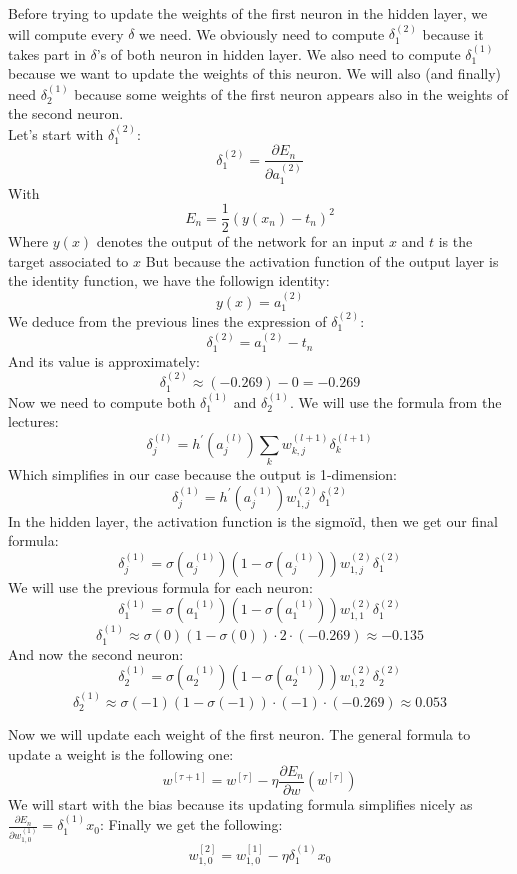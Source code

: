 \documentclass[a4paper, 10pt]{article}
\begin{document}
Before trying to update the weights of the first neuron in the hidden layer, we will compute every $\delta$ we need.
We obviously need to compute $\delta_1^{(2)}$ because it takes part in $\delta$'s of both neuron in hidden layer.
We also need to compute $\delta_1^{(1)}$ because we want to update the weights of this neuron. We will also (and finally) need 
$\delta_2^{(1)}$ because some weights of the first neuron appears also in the weights of the second neuron.
\\
Let's start with $\delta_1^{(2)}$:
$$
\delta_1^{(2)} =  \frac{\partial E_n}{\partial a_1^{(2)}}
$$
With 
$$
E_n = \frac{1}{2} (y(x_n)-t_n)^2
$$
Where $y(x)$ denotes the output of the network for an input $x$ and $t$ is the target associated to $x$
But because the activation function of the output layer is the identity function, we have the followign identity:
$$
y(x) = a_1^{(2)}
$$
We deduce from the previous lines the expression of $\delta_1^{(2)}$:
$$
\delta_1^{(2)} = a_1^{(2)} - t_n
$$
And its value is approximately:
$$
\delta_1^{(2)} \approx (-0.269) - 0 = -0.269
$$
Now we need to compute both $\delta_1^{(1)}$ and $\delta_2^{(1)}$.
We will use the formula from the lectures:
$$
\delta_j^{(l)} = h^\prime(a_j^{(l)})\sum_k w_{k,j}^{(l+1)}\delta_k^{(l+1)} 
$$
Which simplifies in our case because the output is 1-dimension:
$$
\delta_j^{(1)} = h^\prime(a_j^{(1)})w_{1,j}^{(2)}\delta_1^{(2)} 
$$
In the hidden layer, the activation function is the sigmoïd, then we get our final formula:
$$
\delta_j^{(1)} = \sigma(a_j^{(1)})(1-\sigma(a_j^{(1)}))w_{1,j}^{(2)}\delta_1^{(2)} 
$$
We will use the previous formula for each neuron:
$$
\delta_1^{(1)} = \sigma(a_1^{(1)})(1-\sigma(a_1^{(1)}))w_{1,1}^{(2)}\delta_1^{(2)} 
$$
$$
\delta_1^{(1)} \approx \sigma(0)(1-\sigma(0))\cdot2\cdot(-0.269) \approx -0.135
$$
And now the second neuron:
$$
\delta_2^{(1)} = \sigma(a_2^{(1)})(1-\sigma(a_2^{(1)}))w_{1,2}^{(2)}\delta_2^{(2)} 
$$
$$
\delta_2^{(1)} \approx \sigma(-1)(1-\sigma(-1))\cdot(-1)\cdot(-0.269) \approx 0.053
$$

Now we will update each weight of the first neuron. The general formula to update a weight is the following one:
$$
w^{[\tau +1]} = w^{[\tau]} - \eta \frac{\partial E_n}{\partial w}(w^{[\tau]})
$$
We will start with the bias because its updating formula simplifies nicely as $\frac{\partial E_n}{\partial w_{1,0}^{(1)}}=\delta_1^{(1)}x_0$:
Finally we get the following:
$$
w_{1,0}^{[2]} = w_{1,0}^{[1]} - \eta \delta_1^{(1)}x_0
$$
\end{document}
